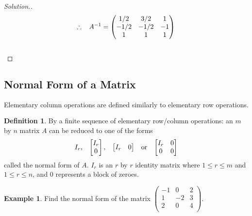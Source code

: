 \documentclass[11pt,a4paper]{article}
\theoremstyle{definition}
\newtheorem{defn}[thm]{Definition}
\newtheorem{exa}[thm]{Example}
\newenvironment{solution}
  {\renewcommand{\qedsymbol}{}\begin{proof}[\textit{Solution}.]}
  {\end{proof}}
\begin{document}
\begin{solution}
$$\therefore\hspace{0.3cm}
A^{-1}=
\begin{pmatrix}
1/2&3/2&1\\-1/2&-1/2&-1\\1&1&1\\
\end{pmatrix}
$$\\


\pagebreak
\end{solution}

\subsection{Normal Form of a Matrix}
Elementary column operations are defined similarly to elementary row operations.


\begin{defn}
By a finite sequence of elementary row/column operations: an $m$ by $n$ matrix $A$ can be reduced to one of the forms $$I_r,\hspace{0.3cm}
\begin{bmatrix}
I_r\\0\\
\end{bmatrix}
,\hspace{0.3cm}
\begin{bmatrix}
I_r&0\\
\end{bmatrix}
\hspace{0.3cm}\text{or}\hspace{0.3cm}
\begin{bmatrix}
I_r&0\\0&0\\
\end{bmatrix}
$$ called the normal form of $A$. $I_r$ is an $r$ by $r$ identity matrix where $1\leq r\leq m$ and $1\leq r\leq n$, and $0$ represents a block of zeroes.
\end{defn}
\begin{exa}
Find the normal form of the matrix
$
\begin{pmatrix}
-1&0&2\\1&-2&3\\2&0&4\\
\end{pmatrix}
$.
\end{exa}
\end{document}
